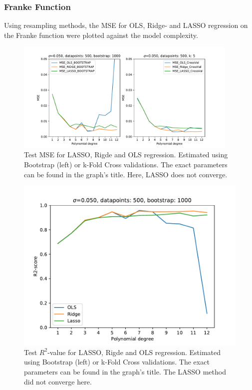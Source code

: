 \documentclass[11pt,a4paper,titlepage]{article}
\begin{document}
\subsubsection{Franke Function}
Using resampling methods, the MSE for OLS, Ridge- and LASSO regression on the Franke function were plotted against the model complexity.
\begin{figure}[H]
\centering
\includegraphics[width=0.95\textwidth]{MSE_different_methods_Franke.pdf}
\caption[Test MSE for LASSO, Rigde and OLS regression]{Test MSE for LASSO, Rigde and OLS regression. Estimated using Bootstrap (left) or k-Fold Cross validations. The exact parameters can be found in the graph's title. Here, LASSO does not converge.}
\label{fig:MSE_different_methods_Franke}
\end{figure}
\begin{figure}[H]
\centering
\includegraphics[trim=0.7cm 0.2cm 1cm 0.85cm, clip=true,scale = 0.7]{R2_bootstrap_different_methods_Franke.pdf}
\caption[Test $R^2$-value for LASSO, Rigde and OLS regression]{Test $R^2$-value for LASSO, Rigde and OLS regression. Estimated using Bootstrap (left) or k-Fold Cross validations. The exact parameters can be found in the graph's title. The LASSO method did not converge here.}
\label{fig:R2_different_methods_Franke}
\end{figure}
\end{document}
